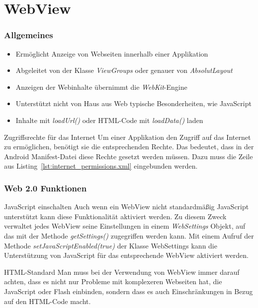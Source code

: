 \section{WebView}
\begin{frame}[label=webview]
   \frametitle{Allgemeines}
   \begin{itemize}
      \item Ermöglicht Anzeige von Webseiten innerhalb einer Applikation
      \item Abgeleitet von der Klasse \emph{ViewGroups} oder genauer von \emph{AbsolutLayout}
      \item Anzeigen der Webinhalte übernimmt die \emph{WebKit}-Engine
      \item Unterstützt nicht von Haus aus Web typische Besonderheiten, wie JavaScript
      \item Inhalte mit \emph{loadUrl()} oder HTML-Code mit \emph{loadData()} laden
   \end{itemize}

   \begin{alertblock}{Zugriffsrechte für das Internet}
      Um einer Applikation den Zugriff auf das Internet zu ermöglichen, benötigt sie 
      die entsprechenden Rechte. Das bedeutet, dass in der Android Manifest-Datei 
      diese Rechte gesetzt werden müssen. Dazu muss die Zeile aus 
      Listing~\ref{lst:internet_permissions.xml} eingebunden werden.

      \vspace{3mm}

       
   \end{alertblock}
\end{frame}

\begin{frame}
   \frametitle{Web 2.0 Funktionen}
   \begin{alertblock}{JavaScript einschalten}
      Auch wenn ein WebView nicht standardmäßig JavaScript unterstützt kann diese 
      Funktionalität aktiviert werden. Zu diesem Zweck verwaltet jedes WebView 
      seine Einstellungen in einem \emph{WebSettings} Objekt, auf das mit der 
      Methode \emph{getSettings()} zugegriffen werden kann. Mit einem Aufruf 
      der Methode \emph{setJavaScriptEnabled(true)} der Klasse WebSettings 
      kann die Unterstützung von JavaScript für das entsprechende WebView aktiviert werden.
   \end{alertblock}

   \begin{alertblock}{HTML-Standard}
      Man muss bei der Verwendung von WebView immer darauf achten, dass es nicht 
      nur Probleme mit komplexeren Webseiten hat, die JavaScript oder Flash einbinden, 
      sondern dass es auch Einschränkungen in Bezug auf den HTML-Code macht.
   \end{alertblock}
\end{frame}

